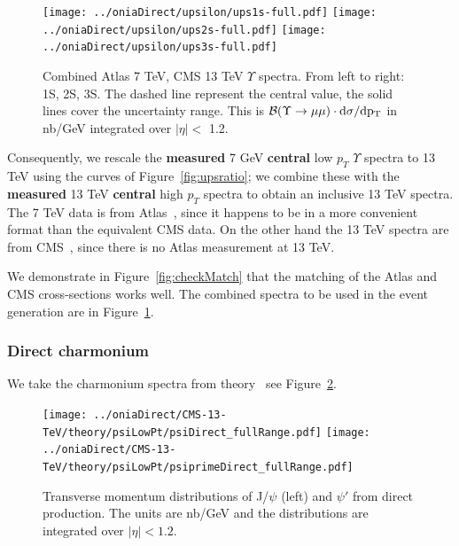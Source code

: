 \documentclass[12pt]{article}
\begin{document}
\begin{figure}
\begin{adjustwidth}{-2cm}{-2cm}
\centering
\texttt{[image: ../oniaDirect/upsilon/ups1s-full.pdf]}
\texttt{[image: ../oniaDirect/upsilon/ups2s-full.pdf]}
\texttt{[image: ../oniaDirect/upsilon/ups3s-full.pdf]}
\end{adjustwidth}
\caption{\protect Combined Atlas 7 TeV, CMS 13 TeV $\Upsilon$ spectra.
  From left to right: 1S, 2S, 3S. 
The dashed line represent the central value, the solid
  lines cover the uncertainty range.  This is ${\cal B}(\Upsilon \to \mu\mu) \cdot
  \rm{d}\sigma/\rm{d}p_T$ in nb/GeV integrated
  over $|\eta| <$ 1.2.}
\label{fig:upsFinal}
\end{figure}

  
Consequently,  we rescale the {\bf measured} 7 GeV {\bf central} low
$p_T$ $\Upsilon$ spectra to 13 TeV using the curves of
Figure~\ref{fig:upsratio};  we combine these with the {\bf measured} 13 TeV 
  {\bf central} high $p_T$ spectra to obtain an inclusive 13 TeV spectra.  The 7 TeV data
  is from Atlas~\cite{Aad:2012dlq}, since it happens to be in a more
  convenient format than the equivalent CMS data.
On the other hand the 13 TeV spectra are from
  CMS~\cite{Sirunyan:2017qdw}, since there is no Atlas measurement at
  13 TeV.

We demonstrate in Figure~\ref{fig:checkMatch} that the
  matching of the Atlas and CMS cross-sections works well.  The combined
  spectra to be used in the event generation are in Figure~\ref{fig:upsFinal}.


\subsubsection{Direct charmonium}
\label{sec:psidirect}
We take the charmonium spectra from theory~\cite{Ma:2010yw, Ma:2010jj, Ma:2014mri}
see Figure~\ref{fig:ma}.  

\begin{figure}
\texttt{[image: ../oniaDirect/CMS-13-TeV/theory/psiLowPt/psiDirect\_fullRange.pdf]}  
\texttt{[image: ../oniaDirect/CMS-13-TeV/theory/psiLowPt/psiprimeDirect\_fullRange.pdf]}  
  \caption{Transverse momentum distributions of J/$\psi$ (left) 
and $\psi'$ from direct production. The units are nb/GeV and the 
distributions 
are integrated over $|\eta|<1.2$.}
  \label{fig:ma}
\end{figure}
\end{document}
